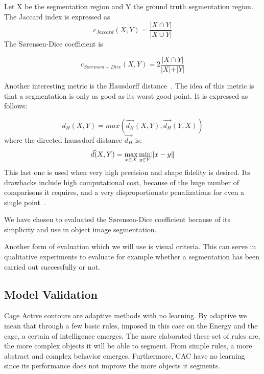Let X be the segmentation region and Y the ground truth segmentation region. 
The Jaccard index is expressed as 
\begin{equation}\label{eq:jaccard_coeff}
	c_{Jaccard}(X,Y)= \frac{\vert X \cap Y \vert}{\vert X \cup  Y \vert} 
\end{equation}
The S\o rensen-Dice coefficient is

\begin{equation}\label{eq:sorensen-dice_coeff}
	c_{Sorensen-Dice}(X,Y)= 2\frac{\vert X \cap Y \vert}{\vert X \vert + \vert Y \vert} 
\end{equation}

Another interesting metric is the Hausdorff distance~\cite{evaluation_metrics}. The idea of this metric is that a segmentation is only as good as its worst good point. It is expressed as follows:

\begin{equation}\label{eq:haussdorff_coeff}
d_{H}(X,Y)= max(\vec{d_H}(X,Y),\vec{d_H}(Y,X))
\end{equation}
where the directed haussdorf distance $\vec{d_H}$ is:
\begin{equation}\label{eq:directed_haussdorff_coeff}
\vec{d}(X,Y) = \max\limits_{x\in X}\min\limits_{y\in Y}\lVert x-y\rVert
\end{equation}
This last one is used when very high precision and shape fidelity is desired. Its drawbacks include high computational cost, because of the huge number of comparisons it requires, and a very disproportionate penalizations for even a single point~\cite{Huttenlocher:1993:CIU:628305.628513}.

We have chosen to evaluated the S\o rensen-Dice coefficient because of its simplicity and use in object image segmentation. 

Another form of evaluation which we will use is visual criteria. This can serve in qualitative experiments to evaluate for example whether a segmentation has been carried out successfully or not. 

\subsection{Model Validation}
\label{subsec:model_validation}

Cage Active contours are adaptive methods with no learning. By adaptive we mean that through a few basic rules, imposed in this case on the Energy and the cage, a certain of intelligence emerges. The more elaborated these set of rules are, the more complex objects it will be able to segment. From simple rules, a more abstract and complex behavior emerges. Furthermore, CAC have no learning since its performance does not improve the more objects it segments. 

